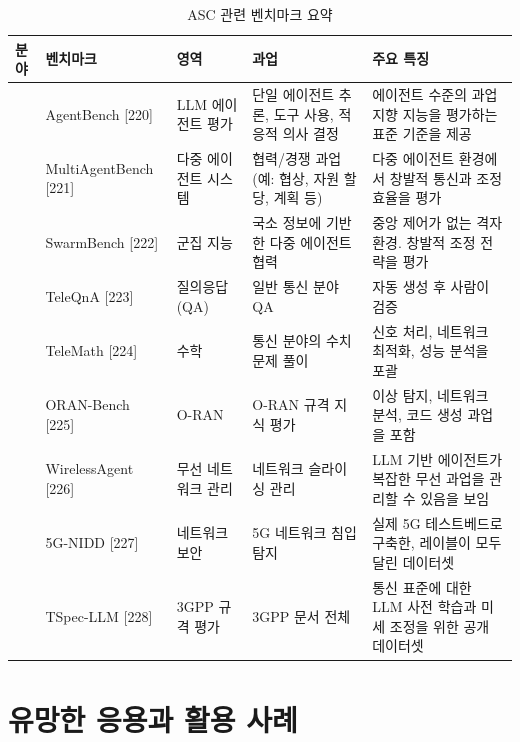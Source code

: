 \setcounter{table}{10}
\begin{table}[htbp]
\centering
\caption{ASC 관련 벤치마크 요약}
\label{tab:11}
\footnotesize
\renewcommand{\arraystretch}{1.25}
\begin{tabularx}{\linewidth}{|>{\centering\arraybackslash}p{1.7cm}|>{\centering\arraybackslash}p{2.7cm}|>{\centering\arraybackslash}p{2.0cm}|>{\centering\arraybackslash}X|>{\centering\arraybackslash}X|}
\hline
\textbf{분야} & \textbf{벤치마크} & \textbf{영역} & \textbf{과업} & \textbf{주요 특징} \\
\hline
\multirow{3}{=}{\centering 일반 LLM 에이전트}
 & AgentBench [220] & LLM 에이전트 평가 & 단일 에이전트 추론, 도구 사용, 적응적 의사 결정 & 에이전트 수준의 과업 지향 지능을 평가하는 표준 기준을 제공 \\
\cline{2-5}
 & MultiAgentBench [221] & 다중 에이전트 시스템 & 협력/경쟁 과업 (예: 협상, 자원 할당, 계획 등) & 다중 에이전트 환경에서 창발적 통신과 조정 효율을 평가 \\
\cline{2-5}
 & SwarmBench [222] & 군집 지능 & 국소 정보에 기반한 다중 에이전트 협력 & 중앙 제어가 없는 격자 환경. 창발적 조정 전략을 평가 \\
\hline
\multirow{6}{=}{\centering 무선 통신}
 & TeleQnA [223] & 질의응답(QA) & 일반 통신 분야 QA & 자동 생성 후 사람이 검증 \\
\cline{2-5}
 & TeleMath [224] & 수학 & 통신 분야의 수치 문제 풀이 & 신호 처리, 네트워크 최적화, 성능 분석을 포괄 \\
\cline{2-5}
 & ORAN-Bench [225] & O-RAN & O-RAN 규격 지식 평가 & 이상 탐지, 네트워크 분석, 코드 생성 과업을 포함 \\
\cline{2-5}
 & WirelessAgent [226] & 무선 네트워크 관리 & 네트워크 슬라이싱 관리 & LLM 기반 에이전트가 복잡한 무선 과업을 관리할 수 있음을 보임 \\
\cline{2-5}
 & 5G-NIDD [227] & 네트워크 보안 & 5G 네트워크 침입 탐지 & 실제 5G 테스트베드로 구축한, 레이블이 모두 달린 데이터셋 \\
\cline{2-5}
 & TSpec-LLM [228] & 3GPP 규격 평가 & 3GPP 문서 전체 & 통신 표준에 대한 LLM 사전 학습과 미세 조정을 위한 공개 데이터셋 \\
\hline
\end{tabularx}
\end{table}

\section{유망한 응용과 활용 사례}

